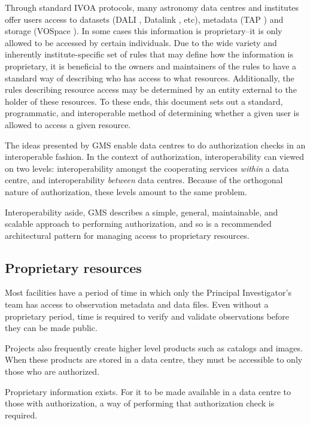 \documentclass[11pt,a4paper]{ivoa}
\begin{document}
Through standard IVOA protocols, many astronomy data centres and institutes offer users access to datasets (DALI \citep{std:DALI}, Datalink \citep{std:Datalink}, etc), metadata (TAP \citep{std:TAP}) and storage (VOSpace \citep{std:VOSpace}).  In some cases this information is proprietary--it is only allowed to be accessed by certain individuals.  Due to the wide variety and inherently institute-specific set of rules that may define how the information is proprietary, it is beneficial to the owners and maintainers of the rules to have a standard way of describing who has access to what resources.  Additionally, the rules describing resource access may be determined by an entity external to the holder of these resources.  To these ends, this document sets out a standard, programmatic, and interoperable method of determining whether a given user is allowed to access a given resource.

The ideas presented by GMS enable data centres to do authorization checks in an interoperable fashion.  In the context of authorization, interoperability can viewed on two levels:  interoperability amongst the cooperating services \emph{within} a data centre, and interoperability \emph{between} data centres.  Because of the orthogonal nature of authorization, these levels amount to the same problem.

Interoperability aside, GMS describes a simple, general, maintainable, and scalable approach to performing authorization, and so is a recommended architectural pattern for managing access to proprietary resources.

\subsection{Proprietary resources}

Most facilities have a period of time in which only the Principal Investigator's team has access to observation metadata and data files.  Even without a proprietary period, time is required to verify and validate observations before they can be made public.

Projects also frequently create higher level products such as catalogs and images.  When these products are stored in a data centre, they must be accessible to only those who are authorized.

Proprietary information exists.  For it to be made available in a data centre to those with authorization, a way of performing that authorization check is required.
\end{document}
